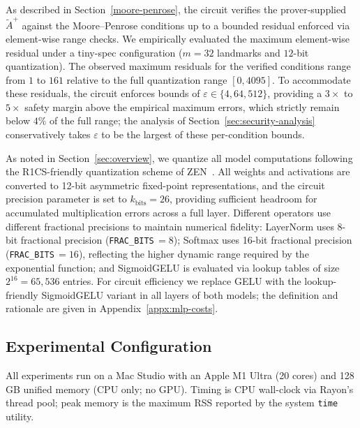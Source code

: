 \label{subsec:pseudoinverse}
As described in Section~\ref{moore-penrose}, the circuit verifies the prover-supplied $\tilde{A}^{+}$ against the Moore--Penrose conditions up to a bounded residual enforced via element-wise range checks.
We empirically evaluated the maximum element-wise residual under a tiny-spec configuration ($m{=}32$ landmarks and $12$-bit quantization).
The observed maximum residuals for the verified conditions range from $1$ to $161$ relative to the full quantization range $[0, 4095]$.
To accommodate these residuals, the circuit enforces bounds of $\varepsilon \in \{4, 64, 512\}$, providing a $3\times$ to $5\times$ safety margin above the empirical maximum errors, which strictly remain below $4\%$ of the full range; the analysis of Section~\ref{sec:security-analysis} conservatively takes $\varepsilon$ to be the largest of these per-condition bounds.

\label{subsec:quantization}
As noted in Section~\ref{sec:overview}, we quantize all model computations following the R1CS-friendly quantization scheme of ZEN~\cite{ZEN}. All weights and activations are converted to 12-bit asymmetric fixed-point representations, and the circuit precision parameter is set to $k_{\text{bits}} = 26$, providing sufficient headroom for accumulated multiplication errors across a full layer. Different operators use different fractional precisions to maintain numerical fidelity: LayerNorm uses 8-bit fractional precision (\texttt{FRAC\_BITS}$\,= 8$); Softmax uses 16-bit fractional precision (\texttt{FRAC\_BITS}$\,= 16$), reflecting the higher dynamic range required by the exponential function; and SigmoidGELU is evaluated via lookup tables of size $2^{16} = 65{,}536$ entries.
For circuit efficiency we replace GELU with the lookup-friendly SigmoidGELU variant in all layers of both models; the definition and rationale are given in Appendix~\ref{appx:mlp-costs}.

\subsection{Experimental Configuration}
\label{subsec:configuration}

All experiments run on a Mac Studio with an Apple M1 Ultra (20 cores) and 128\,GB unified memory (CPU only; no GPU). Timing is CPU wall-clock via Rayon's thread pool; peak memory is the maximum RSS reported by the system \texttt{time} utility.

